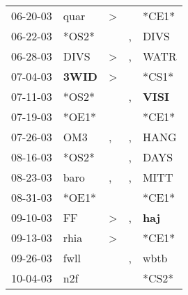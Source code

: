 \begin{supertabular}{p{0.07\textwidth}p{0.06\textwidth}p{0.02\textwidth}p{0.02\textwidth}p{0.06\textwidth}}
          06-20-03\textsuperscript{} &           quar\textsuperscript{} &     \textgreater &                  &                            *CE1* \\
          06-22-03\textsuperscript{} &                            *OS2* &                  &                , &           DIVS\textsuperscript{} \\
          06-28-03\textsuperscript{} &           DIVS\textsuperscript{} &     \textgreater &                , &           WATR\textsuperscript{} \\
          07-04-03\textsuperscript{} &  \textbf{3WID\textsuperscript{}} &     \textgreater &                  &                            *CS1* \\
          07-11-03\textsuperscript{} &                            *OS2* &                  &                , &  \textbf{VISI\textsuperscript{}} \\
          07-19-03\textsuperscript{} &                            *OE1* &                  &                  &                            *CE1* \\
          07-26-03\textsuperscript{} &            OM3\textsuperscript{} &                , &                , &           HANG\textsuperscript{} \\
          08-16-03\textsuperscript{} &                            *OS2* &                  &                , &           DAYS\textsuperscript{} \\
          08-23-03\textsuperscript{} &           baro\textsuperscript{} &                , &                , &           MITT\textsuperscript{} \\
          08-31-03\textsuperscript{} &                            *OE1* &                  &                  &                            *CE1* \\
          09-10-03\textsuperscript{} &             FF\textsuperscript{} &     \textgreater &                , &   \textbf{haj\textsuperscript{}} \\
          09-13-03\textsuperscript{} &           rhia\textsuperscript{} &     \textgreater &                  &                            *CE1* \\
          09-26-03\textsuperscript{} &           fwll\textsuperscript{} &                  &                , &           wbtb\textsuperscript{} \\
          10-04-03\textsuperscript{} &            n2f\textsuperscript{} &                  &                  &                            *CS2* \\

\end{supertabular}
